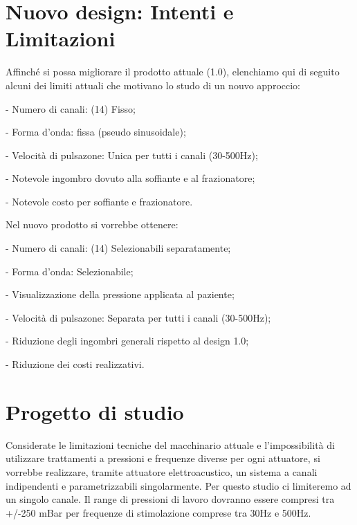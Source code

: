 \documentclass[lettersize,journal,onecolumn]{IEEEtran}
\begin{document}
\section{Nuovo design: Intenti e \\ Limitazioni}
\noindent Affinché si possa migliorare il prodotto attuale (1.0), elenchiamo qui di seguito alcuni dei limiti attuali che motivano lo studo di un nouvo approccio:
\begin{list}{}{}
\item{- Numero di canali: (14) Fisso;}
\item{- Forma d'onda: fissa (pseudo sinusoidale);}
\item{- Velocità di pulsazone: Unica per tutti i canali (30-500Hz);}
\item{- Notevole ingombro dovuto alla soffiante e al frazionatore;}
\item{- Notevole costo per soffiante e frazionatore.}
\end{list}
Nel nuovo prodotto si vorrebbe ottenere:
\begin{list}{}{}
\item{- Numero di canali: (14) Selezionabili separatamente;}
\item{- Forma d'onda: Selezionabile;}
\item{- Visualizzazione della pressione applicata al paziente;}
\item{- Velocità di pulsazone: Separata per tutti i canali (30-500Hz);}
\item{- Riduzione degli ingombri generali rispetto al design 1.0;}
\item{- Riduzione dei costi realizzativi.}
\end{list}
\section{Progetto di studio}
\noindent Considerate le limitazioni tecniche del macchinario attuale e l'impossibilità di utilizzare trattamenti a pressioni e frequenze diverse per ogni attuatore, si vorrebbe realizzare, tramite attuatore elettroacustico, un sistema a canali indipendenti e parametrizzabili singolarmente. Per questo studio ci limiteremo ad un singolo canale.
\noindent Il range di pressioni di lavoro dovranno essere compresi tra +/-250 mBar per frequenze di stimolazione comprese tra 30Hz e 500Hz.
\end{document}
